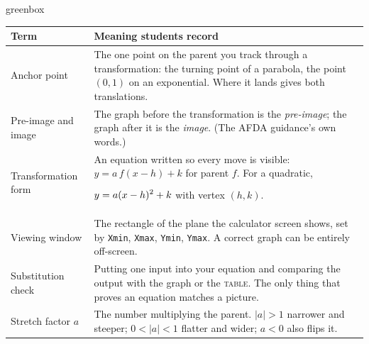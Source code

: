 \documentclass[10pt]{article}
\newcommand{\TallMath}[1]{$\displaystyle #1\rule[-1.4em]{0pt}{3.2em}$}
\begin{document}
\begin{skillbox}{greenbox}
\renewcommand{\arraystretch}{1.35}
\begin{tabularx}{\linewidth}{@{}p{3.6cm}X@{}}
\textbf{Term} & \textbf{Meaning students record} \\
\hline
Anchor point & The one point on the parent you track through a transformation: the turning point of
    a parabola, the point $(0,1)$ on an exponential. Where it lands gives both translations. \\
Pre-image and image & The graph before the transformation is the \emph{pre-image}; the graph after
    it is the \emph{image}. (The AFDA guidance's own words.) \\
Transformation form & An equation written so every move is visible: $y=a\,f(x-h)+k$ for parent $f$.
    For a quadratic, \TallMath{y=a(x-h)^2+k} with vertex $(h,k)$. \\
Viewing window & The rectangle of the plane the calculator screen shows, set by \texttt{Xmin},
    \texttt{Xmax}, \texttt{Ymin}, \texttt{Ymax}. A correct graph can be entirely off-screen. \\
Substitution check & Putting one input into your equation and comparing the output with the graph or
    the \textsc{table}. The only thing that proves an equation matches a picture. \\
Stretch factor $a$ & The number multiplying the parent. $|a|>1$ narrower and steeper; $0<|a|<1$
    flatter and wider; $a<0$ also flips it. \\
\end{tabularx}
\end{skillbox}
\end{document}
